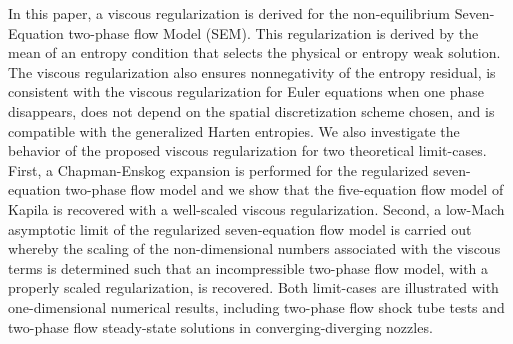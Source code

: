 In this paper, a viscous regularization is derived for the non-equilibrium Seven-Equation two-phase flow Model (SEM). 
This regularization is derived by the mean of an entropy condition that selects the physical or entropy weak solution.
  
The viscous regularization also ensures nonnegativity of the entropy residual,   
is consistent with the viscous regularization for Euler equations when one phase disappears, does not depend on the spatial discretization scheme chosen, 
and is compatible with the generalized Harten entropies. 
%
We also investigate the behavior of the proposed viscous regularization for two theoretical 
 limit-cases. 
First, a Chapman-Enskog expansion is performed for the regularized seven-equation two-phase flow model and 
we show that the five-equation flow  model of Kapila is recovered with a well-scaled viscous regularization. 
Second, a low-Mach asymptotic limit of the regularized seven-equation flow model is carried out whereby the 
scaling of the non-dimensional numbers associated with the viscous terms is determined such that an 
incompressible two-phase flow model, with a properly scaled regularization, is recovered. 
Both limit-cases are illustrated with one-dimensional numerical results, including two-phase flow shock tube tests 
and two-phase flow steady-state solutions in converging-diverging nozzles.